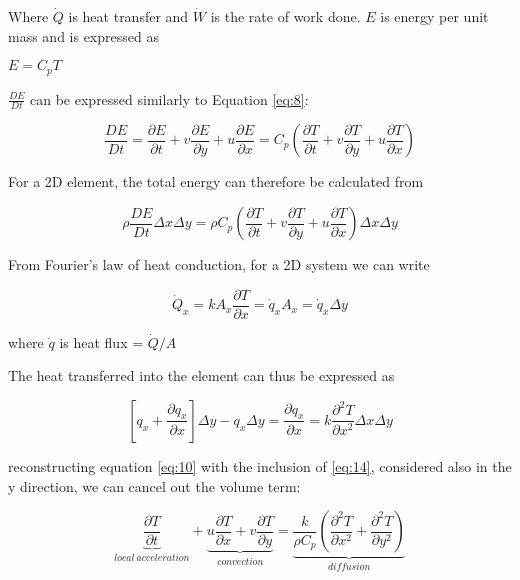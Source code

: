     Where $\dot{Q}$ is heat transfer and $\dot{W}$ is the rate of work done. $E$ is energy per unit mass and is expressed as

    \centerline{$E = C_{p} T$}

    $\frac{DE}{Dt}$ can be expressed similarly to Equation \ref{eq:8}:

    \begin{equation} \label{eq:11}
      \frac{DE}{Dt} = \frac{\partial E}{\partial t} + v \frac{\partial E}{\partial y} + u \frac{\partial E}{\partial x} = C_{p} (\frac{\partial T}{\partial t} + v \frac{\partial T}{\partial y} + u \frac{\partial T}{\partial x})
    \end{equation}

    For a 2D element, the total energy can therefore be calculated from

    \begin{equation} \label{eq:12}
      \rho \frac{DE}{Dt} \Delta x \Delta y = \rho   C_{p} (\frac{\partial T}{\partial t} + v \frac{\partial T}{\partial y} + u \frac{\partial T}{\partial x}) \Delta x \Delta y
    \end{equation}

    From Fourier's law of heat conduction, for a 2D system we can write

    \begin{equation} \label{eq:13}
      \dot{Q}_{x} = k A_{x} \frac{\partial T}{\partial x} = \dot{q}_{x} A_{x} = \dot{q}_{x} \Delta y
    \end{equation}

    where $\dot{q}$ is heat flux = $\dot{Q}/A$

    The heat transferred into the element can thus be expressed as

    \begin{equation} \label{eq:14}
      [q_{x} + \frac{\partial q_{x}}{\partial x}] \Delta y - q_{x} \Delta y = \frac{\partial q_{x}}{\partial x} = k \frac{\partial^2 T}{\partial x^2} \Delta x \Delta y
    \end{equation}

    reconstructing equation \ref{eq:10} with the inclusion of \ref{eq:14}, considered also in the y direction, we can cancel out the volume term:

    \begin{equation} \label{eq:15}
      \underbrace{\frac{\partial T}{\partial t}}_{local\ acceleration} + \underbrace{u \frac{\partial T}{\partial x} + v \frac{\partial T}{\partial y}}_{convection} = \underbrace{\frac{k}{\rho C_{p}} ( \frac{\partial^2 T}{\partial x^2} + \frac{\partial^2 T}{\partial y^2} )}_{diffusion}
    \end{equation}

